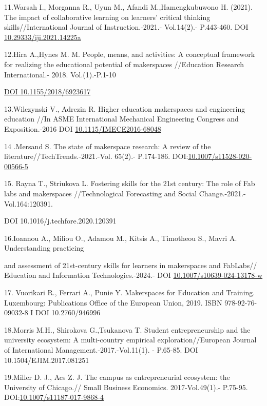11.Warsah I., Morganna R., Uyun M., Afandi M.,Hamengkubuwono H. (2021).
The impact of collaborative learning on learners' critical thinking
skills//International Journal of Instruction.-2021.- Vol.14(2).-
P.443-460. DOI
\href{http://dx.doi.org/10.29333/iji.2021.14225a}{10.29333/iji.2021.14225a}

12.Hira A.,Hynes M. M. People, means, and activities: A conceptual
framework for realizing the educational potential of makerspaces
//Education Research International.- 2018. Vol.(1).-P.1-10

\href{https://doi.org/10.1155/2018/6923617}{DOI 10.1155/2018/6923617}

13.Wilczynski V., Adrezin R. Higher education makerspaces and
engineering education //In ASME International Mechanical Engineering
Congress and Exposition.-2016 DOI
\href{http://dx.doi.org/10.1115/IMECE2016-68048}{10.1115/IMECE2016-68048}

14 .Mersand S. The state of makerspace research: A review of the
literature//TechTrends.-2021.-Vol. 65(2).- P.174-186.
DOI:\href{http://dx.doi.org/10.1007/s11528-020-00566-5}{10.1007/s11528-020-00566-5}

15. Rayna T., Striukova L. Fostering skills for the 21st century: The
role of Fab labs and makerspaces //Technological Forecasting and Social
Change.-2021.-Vol.164:120391.

DOI 10.1016/j.techfore.2020.120391

16.Ioannou A., Miliou O., Adamou M., Kitsis A., Timotheou S., Mavri A.
Understanding practicing

and assessment of 21st-century skills for learners in makerspaces and
FabLabs// Education and Information Technologies.-2024.- DOI
\href{https://doi.org/10.1007/s10639-024-13178-w}{10.1007/s10639-024-13178-w}

17. Vuorikari R., Ferrari A., Punie Y. Makerspaces for Education and
Training. Luxembourg: Publications Office of the European Union, 2019.
ISBN 978-92-76-09032-8 I DOI 10.2760/946996

18.Morris M.H., Shirokova G.,Tsukanova T. Student entrepreneurship and
the university ecosystem: A multi-country empirical
exploration//European Journal of International
Management.-2017.-Vol.11(1). - P.65-85. DOI 10.1504/EJIM.2017.081251

19.Miller D. J., Acs Z. J. The campus as entrepreneurial ecosystem: the
University of Chicago.// Small Business Economics. 2017-Vol.49(1).-
P.75-95.
DOI:\href{https://link.springer.com/article/10.1007/s11187-017-9868-4}{10.1007/s11187-017-9868-4}

